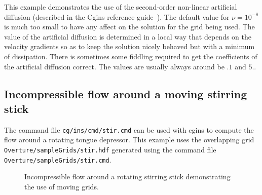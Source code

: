 \documentclass{article}
\newcommand{\Index}[1]{#1\index{#1}}
\begin{document}
This example demonstrates the use of the second-order non-linear \Index{artificial diffusion} (described in the
Cgins reference guide~\cite{CginsReferenceGuide}). The default value for $\nu=10^{-8}$ is much too
small to have any affect on the solution for the grid being used. 
The value of the artificial diffusion is determined in a local way
that depends on the velocity gradients so as to keep the solution nicely behaved but
with a minimum of dissipation. There is sometimes some fiddling required to get the coefficients
of the artificial diffusion correct. The values are usually always around be $.1$ and $5.$.


\subsection{Incompressible flow around a moving stirring stick}

The command file {\tt cg/ins/cmd/stir.cmd} can be used with cgins to compute the
flow around a rotating tongue depressor.
This example uses the overlapping grid {\tt Overture/\-sampleGrids/\-stir.hdf}  generated
using the command file {\tt Overture/\-sampleGrids/\-stir.cmd}.
\noindent

{
\begin{figure}[hbt]
\newcommand{\figWidtha}{9.cm}
\newcommand{\trimfiga}[2]{\trimPlot{#1}{#2}{.0}{.0}{.08}{.025}}
\begin{center}
\end{center} 
 \caption{Incompressible flow around a rotating stirring stick demonstrating the use of moving grids.}
\end{figure}
}

\end{document}
